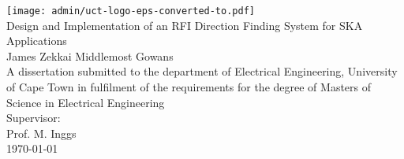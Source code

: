 \begin{titlepage}
\begin{center}

\texttt{[image: admin/uct-logo-eps-converted-to.pdf]}\\[1.6cm]

{\LARGE Design and Implementation of an RFI Direction Finding System for SKA Applications}\\[1.6cm]
{\Large James Zekkai Middlemost Gowans}\\[1.6cm]

A dissertation submitted to the department of Electrical Engineering, University of Cape Town in fulfilment of the requirements for the degree of Masters of Science in Electrical Engineering\\[1.6cm]

Supervisor:\\
Prof. M. Inggs\\[1cm]

\today

\end{center}
\end{titlepage}

